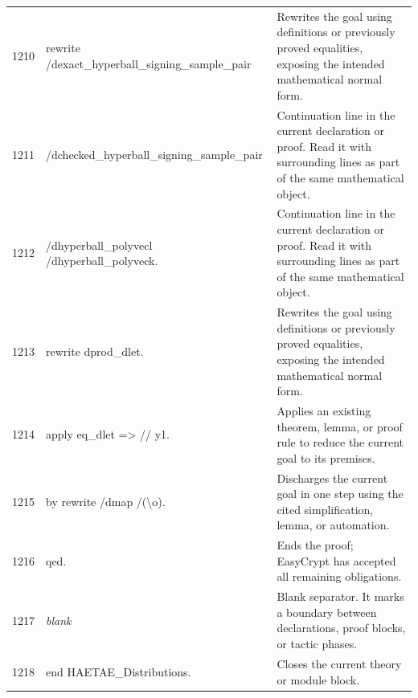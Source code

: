 \documentclass[10pt]{article}
\begin{document}
\begin{longtable}{r L{0.53\textwidth} L{0.37\textwidth}}
1210 & {\ttfamily\scriptsize rewrite /dexact\_hyperball\_signing\_sample\_pair} & Rewrites the goal using definitions or previously proved equalities, exposing the intended mathematical normal form. \\
1211 & {\ttfamily\scriptsize         /dchecked\_hyperball\_signing\_sample\_pair} & Continuation line in the current declaration or proof.  Read it with surrounding lines as part of the same mathematical object. \\
1212 & {\ttfamily\scriptsize         /dhyperball\_polyvecl /dhyperball\_polyveck.} & Continuation line in the current declaration or proof.  Read it with surrounding lines as part of the same mathematical object. \\
1213 & {\ttfamily\scriptsize rewrite dprod\_dlet.} & Rewrites the goal using definitions or previously proved equalities, exposing the intended mathematical normal form. \\
1214 & {\ttfamily\scriptsize apply eq\_dlet => // y1.} & Applies an existing theorem, lemma, or proof rule to reduce the current goal to its premises. \\
1215 & {\ttfamily\scriptsize by rewrite /dmap /(\textbackslash{}o).} & Discharges the current goal in one step using the cited simplification, lemma, or automation. \\
1216 & {\ttfamily\scriptsize qed.} & Ends the proof; EasyCrypt has accepted all remaining obligations. \\
1217 & {\ttfamily\scriptsize \emph{blank}} & Blank separator.  It marks a boundary between declarations, proof blocks, or tactic phases. \\
1218 & {\ttfamily\scriptsize end HAETAE\_Distributions.} & Closes the current theory or module block. \\
\bottomrule
\end{longtable}
\end{document}
